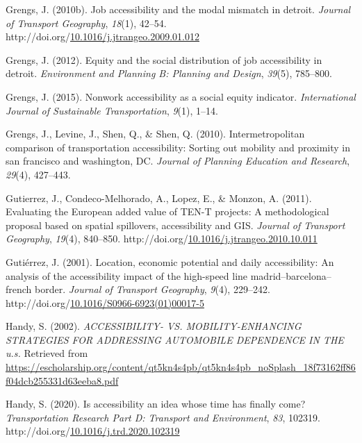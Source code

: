 \documentclass[
11pt, %
oneside, %
english, %
singlespacing, %
]{macthesis} %
\newlength{\cslhangindent}
\newenvironment{CSLReferences}[2] %
{\begin{list}{}{%
	\setlength{\itemindent}{0pt}
	\setlength{\leftmargin}{0pt}
	\setlength{\parsep}{0pt}
	\ifodd #1
	\setlength{\leftmargin}{\cslhangindent}
	\setlength{\itemindent}{-1\cslhangindent}
	\fi
	\setlength{\itemsep}{#2\baselineskip}}}
{\end{list}}
\begin{document}
\begin{CSLReferences}{1}{0}
Grengs, J. (2010b). Job accessibility and the modal mismatch in detroit. \emph{Journal of Transport Geography}, \emph{18}(1), 42--54. http://doi.org/\href{https://doi.org/10.1016/j.jtrangeo.2009.01.012}{10.1016/j.jtrangeo.2009.01.012}

Grengs, J. (2012). Equity and the social distribution of job accessibility in detroit. \emph{Environment and Planning B: Planning and Design}, \emph{39}(5), 785--800.

Grengs, J. (2015). Nonwork accessibility as a social equity indicator. \emph{International Journal of Sustainable Transportation}, \emph{9}(1), 1--14.

Grengs, J., Levine, J., Shen, Q., \& Shen, Q. (2010). Intermetropolitan comparison of transportation accessibility: Sorting out mobility and proximity in san francisco and washington, DC. \emph{Journal of Planning Education and Research}, \emph{29}(4), 427--443.

Gutierrez, J., Condeco-Melhorado, A., Lopez, E., \& Monzon, A. (2011). Evaluating the {European} added value of {TEN}-{T} projects: A methodological proposal based on spatial spillovers, accessibility and {GIS}. \emph{Journal of Transport Geography}, \emph{19}(4), 840--850. http://doi.org/\href{https://doi.org/10.1016/j.jtrangeo.2010.10.011}{10.1016/j.jtrangeo.2010.10.011}

Gutiérrez, J. (2001). Location, economic potential and daily accessibility: An analysis of the accessibility impact of the high-speed line madrid--barcelona--french border. \emph{Journal of Transport Geography}, \emph{9}(4), 229--242. http://doi.org/\href{https://doi.org/10.1016/S0966-6923(01)00017-5}{10.1016/S0966-6923(01)00017-5}

Handy, S. (2002). \emph{{ACCESSIBILITY}- {VS}. {MOBILITY}-{ENHANCING} {STRATEGIES} {FOR} {ADDRESSING} {AUTOMOBILE} {DEPENDENCE} {IN} {THE} u.s.} Retrieved from \url{https://escholarship.org/content/qt5kn4s4pb/qt5kn4s4pb_noSplash_18f73162ff86f04dcb255331d63eeba8.pdf}

Handy, S. (2020). Is accessibility an idea whose time has finally come? \emph{Transportation Research Part D: Transport and Environment}, \emph{83}, 102319. http://doi.org/\href{https://doi.org/10.1016/j.trd.2020.102319}{10.1016/j.trd.2020.102319}


\end{CSLReferences}
\end{document}
